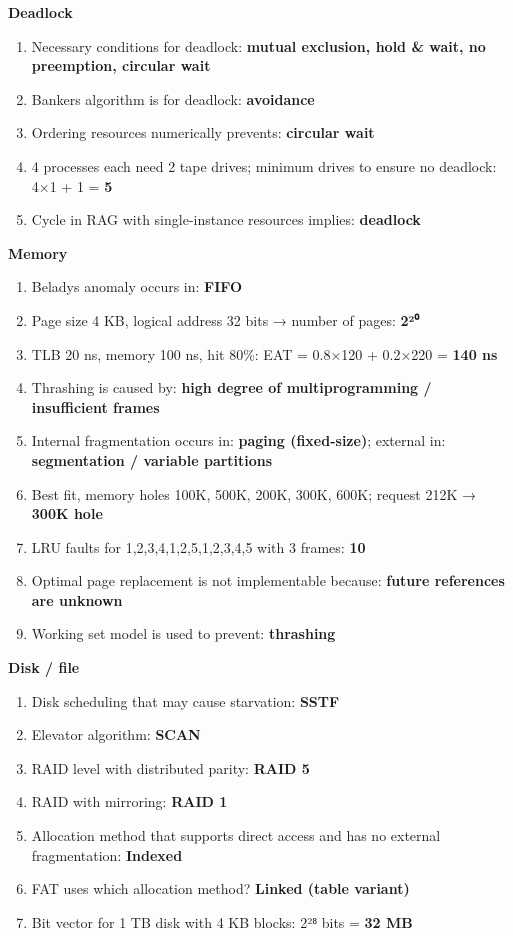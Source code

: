 \textbf{Deadlock}

\begin{enumerate}
\def\labelenumi{\arabic{enumi}.}
\setcounter{enumi}{21}
\tightlist
\item
  Necessary conditions for deadlock: \textbf{mutual exclusion, hold \& wait, no preemption, circular wait}
\item
  Banker\textquotesingle s algorithm is for deadlock: \textbf{avoidance}
\item
  Ordering resources numerically prevents: \textbf{circular wait}
\item
  4 processes each need 2 tape drives; minimum drives to ensure no deadlock: 4×1 + 1 = \textbf{5}
\item
  Cycle in RAG with single-instance resources implies: \textbf{deadlock}
\end{enumerate}

\textbf{Memory}

\begin{enumerate}
\def\labelenumi{\arabic{enumi}.}
\setcounter{enumi}{26}
\tightlist
\item
  Belady\textquotesingle s anomaly occurs in: \textbf{FIFO}
\item
  Page size 4 KB, logical address 32 bits → number of pages: \textbf{2²⁰}
\item
  TLB 20 ns, memory 100 ns, hit 80\%: EAT = 0.8×120 + 0.2×220 = \textbf{140 ns}
\item
  Thrashing is caused by: \textbf{high degree of multiprogramming / insufficient frames}
\item
  Internal fragmentation occurs in: \textbf{paging (fixed-size)}; external in: \textbf{segmentation / variable partitions}
\item
  Best fit, memory holes 100K, 500K, 200K, 300K, 600K; request 212K → \textbf{300K hole}
\item
  LRU faults for 1,2,3,4,1,2,5,1,2,3,4,5 with 3 frames: \textbf{10}
\item
  Optimal page replacement is not implementable because: \textbf{future references are unknown}
\item
  Working set model is used to prevent: \textbf{thrashing}
\end{enumerate}

\textbf{Disk / file}

\begin{enumerate}
\def\labelenumi{\arabic{enumi}.}
\setcounter{enumi}{35}
\tightlist
\item
  Disk scheduling that may cause starvation: \textbf{SSTF}
\item
  Elevator algorithm: \textbf{SCAN}
\item
  RAID level with distributed parity: \textbf{RAID 5}
\item
  RAID with mirroring: \textbf{RAID 1}
\item
  Allocation method that supports direct access and has no external fragmentation: \textbf{Indexed}
\item
  FAT uses which allocation method? \textbf{Linked (table variant)}
\item
  Bit vector for 1 TB disk with 4 KB blocks: 2²⁸ bits = \textbf{32 MB}
\end{enumerate}

